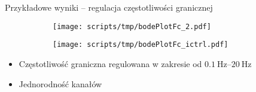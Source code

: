 \begin{frame}{Przykładowe wyniki -- regulacja częstotliwości granicznej}

    \begin{figure}[H]
        \centering
        \begin{subfigure}[b]{0.485\textwidth}
            \centering
            \texttt{[image: scripts/tmp/bodePlotFc\_2.pdf]}  

        \end{subfigure}
        \begin{subfigure}[b]{0.485\textwidth}
            \centering
            \texttt{[image: scripts/tmp/bodePlotFc\_ictrl.pdf]}

        \end{subfigure}     

    \end{figure}
    \vspace{-2em}
    \begin{block}{}
        \begin{itemize}
            \item Częstotliwość graniczna regulowana w zakresie od $\SIrange{0.1}{20}{\hertz}$ 
            \item Jednorodność kanałów 
        \end{itemize}
    \end{block}


\end{frame}

%  






